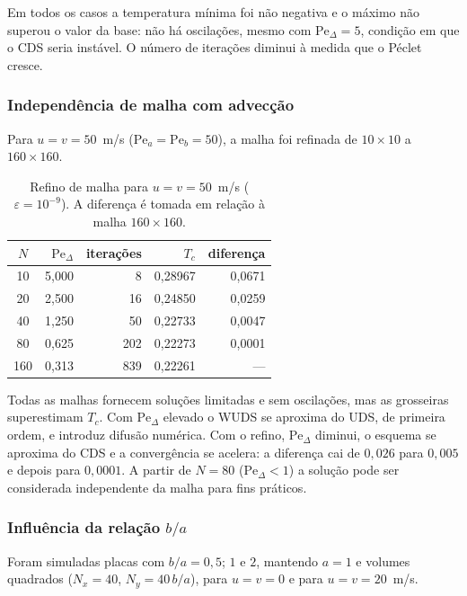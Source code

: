 Em todos os casos a temperatura mínima foi não negativa e o máximo não
superou o valor da base: não há oscilações, mesmo com
$\mathrm{Pe}_\Delta=5$, condição em que o CDS seria instável. O número de
iterações diminui à medida que o Péclet cresce.

\subsubsection*{Independência de malha com advecção}

Para $u=v=50$~m/s ($\mathrm{Pe}_a=\mathrm{Pe}_b=50$), a malha foi refinada de
$10\times10$ a $160\times160$.

\begin{table}[H]
\centering
\caption{Refino de malha para $u=v=50$~m/s ($\varepsilon=10^{-9}$). A
diferença é tomada em relação à malha $160\times160$.}
\begin{tabular}{crrrr}
\hline
$N$ & $\mathrm{Pe}_\Delta$ & iterações & $T_c$ & diferença\\
\hline
10  & 5,000 &   8 & 0,28967 & 0,0671\\
20  & 2,500 &  16 & 0,24850 & 0,0259\\
40  & 1,250 &  50 & 0,22733 & 0,0047\\
80  & 0,625 & 202 & 0,22273 & 0,0001\\
160 & 0,313 & 839 & 0,22261 & ---\\
\hline
\end{tabular}
\end{table}

Todas as malhas fornecem soluções limitadas e sem oscilações, mas as
grosseiras superestimam $T_c$. Com $\mathrm{Pe}_\Delta$ elevado o WUDS se
aproxima do UDS, de primeira ordem, e introduz difusão numérica. Com o
refino, $\mathrm{Pe}_\Delta$ diminui, o esquema se aproxima do CDS e a
convergência se acelera: a diferença cai de $0{,}026$ para $0{,}005$ e
depois para $0{,}0001$. A partir de $N=80$ ($\mathrm{Pe}_\Delta<1$) a
solução pode ser considerada independente da malha para fins práticos.

\vspace{0.5cm}

\subsubsection*{Influência da relação $b/a$}

Foram simuladas placas com $b/a=0{,}5$; $1$ e $2$, mantendo $a=1$ e volumes
quadrados ($N_x=40$, $N_y=40\,b/a$), para $u=v=0$ e para $u=v=20$~m/s.

